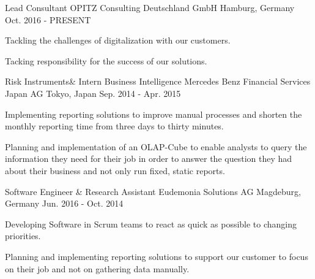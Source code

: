 

\begin{cventries}

  \cventry
    {Lead Consultant} %
    {OPITZ Consulting Deutschland GmbH} %
    {Hamburg, Germany} %
    {Oct. 2016 - PRESENT} %
    {
      \begin{cvitems} %
        \item{Tackling the challenges of digitalization with our customers.}
        \item{Tacking responsibility for the success of our solutions.}
      \end{cvitems}
    }
  \cventry
    {Risk Instruments\& Intern Business Intelligence} %
    {Mercedes Benz Financial Services Japan AG} %
    {Tokyo, Japan} %
    {Sep. 2014 - Apr. 2015} %
    {
      \begin{cvitems} %
        \item{Implementing reporting solutions to improve manual processes and shorten the monthly reporting time from three days to thirty minutes.}
        \item{Planning and implementation of an OLAP-Cube to enable analysts to query the information they need for their job in order to answer the question they had about their business and not only run fixed, static reports.}
      \end{cvitems}
    }
\cventry
    {Software Engineer \& Research Assistant} %
    {Eudemonia Solutions AG} %
    {Magdeburg, Germany} %
    {Jun. 2016 - Oct. 2014} %
    {
      \begin{cvitems} %
        \item{Developing Software in Scrum teams to react as quick as possible to changing priorities.}
        \item{Planning and implementing reporting solutions to support our customer to focus on their job and not on gathering data manually.}
      \end{cvitems}
    }

\end{cventries}
